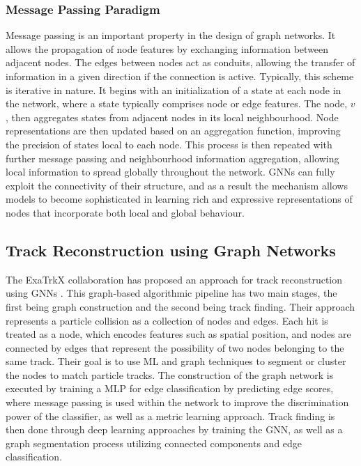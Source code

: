 \subsubsection{Message Passing Paradigm}

Message passing is an important property in the design of graph networks. It allows the propagation of node features by exchanging information between adjacent nodes. The edges between nodes act as conduits, allowing the transfer of information in a given direction if the connection is active. Typically, this scheme is iterative in nature. It begins with an initialization of a state at each node in the network, where a state typically comprises node or edge features. The node, $v$, then aggregates states from adjacent nodes in its local neighbourhood. Node representations are then updated based on an aggregation function, improving the precision of states local to each node. This process is then repeated with further message passing and neighbourhood information aggregation, allowing local information to spread globally throughout the network. GNNs can fully exploit the connectivity of their structure, and as a result the mechanism allows models to become sophisticated in learning rich and expressive representations of nodes that incorporate both local and global behaviour.


\subsection{Track Reconstruction using Graph Networks}
\label{track-recon-graph-networks}

The ExaTrkX collaboration \cite{ExaTrkX-website} has proposed an approach for track reconstruction using GNNs \cite{Caillou:28155782}. This graph-based algorithmic pipeline has two main stages, the first being graph construction and the second being track finding. Their approach represents a particle collision as a collection of nodes and edges. Each hit is treated as a node, which encodes features such as spatial position, and nodes are connected by edges that represent the possibility of two nodes belonging to the same track. Their goal is to use ML and graph techniques to segment or cluster the nodes to match particle tracks. The construction of the graph network is executed by training a MLP for edge classification by predicting edge scores, where message passing is used within the network to improve the discrimination power of the classifier, as well as a metric learning approach. Track finding is then done through deep learning approaches by training the GNN, as well as a graph segmentation process utilizing connected components and edge classification.

